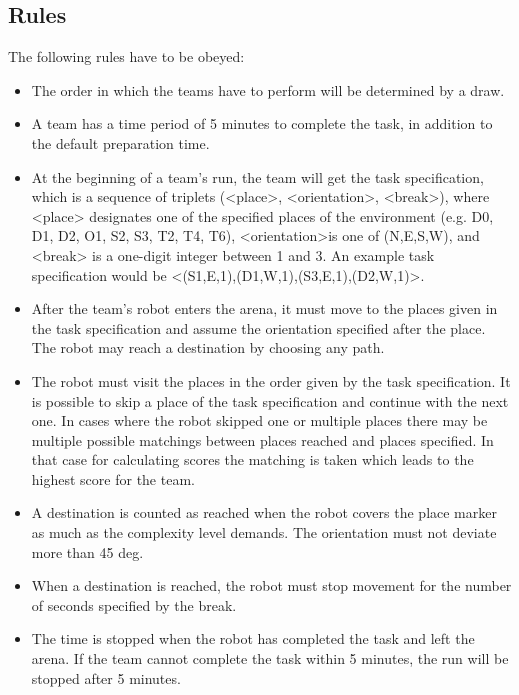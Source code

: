 \subsection{Rules}
The following rules have to be obeyed:

\begin{itemize}
\item The order in which the teams have to perform will be determined by a draw.
\item A team has a time period of 5 minutes to complete the task, in addition to the default preparation time.
\item At the beginning of a team’s run, the team will get the task specification, which is a sequence of triplets (\textless place\textgreater, \textless orientation\textgreater, \textless break\textgreater), where <place> designates one of the specified places of the environment (e.g. D0, D1, D2, O1, S2, S3, T2, T4, T6), \textless orientation\textgreater is one of (N,E,S,W), and <break> is a one-digit integer between 1 and 3. An example task specification would be \textless (S1,E,1),(D1,W,1),(S3,E,1),(D2,W,1)\textgreater . 
\item After the team’s robot enters the arena, it must move to the places given in the task specification and assume the orientation specified after the place. The robot may reach a destination by choosing any path.
\item The robot must visit the places in the order given by the task specification. It is possible to skip a place of the task specification and continue with the next one. In cases where the robot skipped one or multiple places there may be multiple possible matchings between places reached and places specified. In that case for calculating scores the matching is taken which leads to the highest score for the team.
\item A destination is counted as reached when the robot covers the place marker as much as the complexity level demands. The orientation must not deviate more than 45 deg.
\item When a destination is reached, the robot must stop movement for the number of seconds specified by the break. 
\item The time is stopped when the robot has completed the task and left the arena. If the team cannot complete the task within 5 minutes, the run will be stopped after 5 minutes.
\end{itemize}



